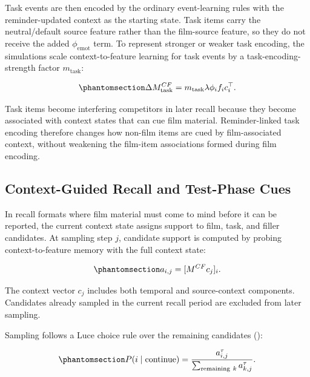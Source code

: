 \documentclass[
  man,
  floatsintext,
  longtable,
  nolmodern,
  notxfonts,
  notimes,
  draftfirst,
  colorlinks=true,linkcolor=blue,citecolor=blue,urlcolor=blue]{apa7}
\begin{document}
Task events are then encoded by the ordinary event-learning rules with
the reminder-updated context as the starting state. Task items carry the
neutral/default source feature rather than the film-source feature, so
they do not receive the added \(\phi_{\mathrm{emot}}\) term. To
represent stronger or weaker task encoding, the simulations scale
context-to-feature learning for task events by a task-encoding-strength
factor \(m_{\mathrm{task}}\):

\begin{equation}\phantomsection\label{eq-task-mcf-learning}{
\Delta M^{CF}_{\mathrm{task}} = m_{\mathrm{task}} \lambda \phi_i f_i c_i^\top .
}\end{equation}

Task items become interfering competitors in later recall because they
become associated with context states that can cue film material.
Reminder-linked task encoding therefore changes how non-film items are
cued by film-associated context, without weakening the film-item
associations formed during film encoding.

\subsection{Context-Guided Recall and Test-Phase
Cues}\label{context-guided-recall-and-test-phase-cues}

In recall formats where film material must come to mind before it can be
reported, the current context state assigns support to film, task, and
filler candidates. At sampling step \(j\), candidate support is computed
by probing context-to-feature memory with the full context state:

\begin{equation}\phantomsection\label{eq-recall-support}{
a_{i,j} = [M^{CF} c_j]_i .
}\end{equation}

The context vector \(c_j\) includes both temporal and source-context
components. Candidates already sampled in the current recall period are
excluded from later sampling.

Sampling follows a Luce choice rule over the remaining candidates
():

\begin{equation}\phantomsection\label{eq-luce-choice}{
P(i \mid \mathrm{continue}) =
\frac{a_{i,j}^{\tau}}{\sum_{\mathrm{remaining}\ k} a_{k,j}^{\tau}} .
}\end{equation}
\end{document}
